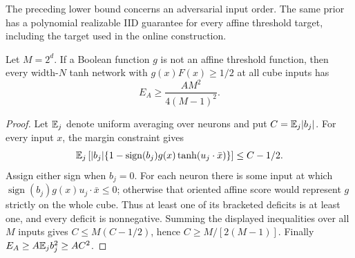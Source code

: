 The preceding lower bound concerns an adversarial input order. The same
prior has a polynomial realizable IID guarantee for every affine threshold
target, including the target used in the online construction.

\begin{lemma}
\label{post:nonthreshold-energy}
Let $M=2^d$. If a Boolean function $g$ is not an affine threshold function,
then every width-$N$ tanh network with
$g(x)F(x)\ge1/2$ at all cube inputs has
\[
 E_A\ge\frac{A M^2}{4(M-1)^2}.
\]
\end{lemma}
\begin{proof}
Let $\mathbb E_j$ denote uniform averaging over neurons and put
$C=\mathbb E_j|b_j|$. For every input $x$, the margin constraint gives
\[
 \mathbb E_j\left[|b_j|\{1-\operatorname{sign}(b_j)g(x)
                  \tanh(u_j\cdot\bar x)\}\right]\le C-1/2.
\]
Assign either sign when $b_j=0$. For each neuron there is some input at
which $\operatorname{sign}(b_j)g(x)u_j\cdot\bar x\le0$; otherwise that
oriented affine score would represent $g$ strictly on the whole cube.
Thus at least one of its bracketed deficits is at least one, and every
deficit is nonnegative. Summing the displayed inequalities over all
$M$ inputs gives $C\le M(C-1/2)$, hence
$C\ge M/[2(M-1)]$. Finally
$E_A\ge A\mathbb E_j b_j^2\ge AC^2$.
\end{proof}


